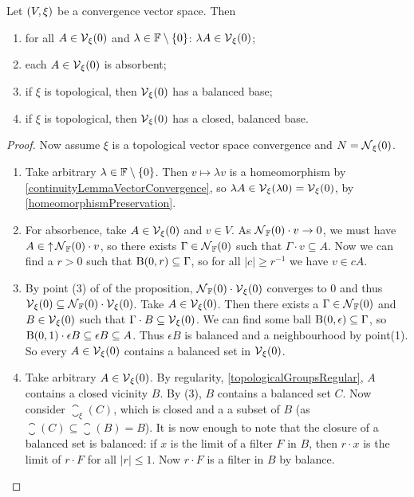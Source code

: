 \begin{corollary} \label{vicinityFilterAtOrigin}
Let $\left( V, \xi \right)$ be a convergence vector space. Then
\begin{enumerate}
\item for all $A\in \operatorname{\mathcal{V}}_\xi(0)$ and $\lambda\in \mathbb{F}\setminus\{0\}$: $\lambda A\in \operatorname{\mathcal{V}}_\xi(0)$;
\item each $A \in \operatorname{\mathcal{V}}_\xi(0)$ is absorbent;
\item if $\xi$ is topological, then $\operatorname{\mathcal{V}}_\xi(0)$ has a balanced base;
\item if $\xi$ is topological, then $\operatorname{\mathcal{V}}_\xi(0)$ has a closed, balanced base.
\end{enumerate}
\end{corollary}
\begin{proof}
Now assume $\xi$ is a topological vector space convergence and $N = \operatorname{\mathcal{N}}_\xi(0)$.
\begin{enumerate}
\item Take arbitrary $\lambda\in\mathbb{F}\setminus\{0\}$. Then $v\mapsto \lambda v$ is a homeomorphism by \ref{continuityLemmaVectorConvergence}, so $\lambda A \in \operatorname{\mathcal{V}}_\xi(\lambda 0) = \operatorname{\mathcal{V}}_\xi(0)$, by \ref{homeomorphismPreservation}.
\item For absorbence, take $A\in \operatorname{\mathcal{V}}_\xi(0)$ and $v\in V$. As $\operatorname{\mathcal{N}}_{\mathbb{F}}(0)\cdot v \to 0$, we must have $A\in \operatorname{\uparrow}\operatorname{\mathcal{N}}_{\mathbb{F}}(0)\cdot v$, so there exists $\Gamma \in \operatorname{\mathcal{N}}_{\mathbb{F}}(0)$ such that $\Gamma\cdot v \subseteq A$. Now we can find a $r>0$ such that $\operatorname{B}(0,r)\subseteq \Gamma$, so for all $|c|\geq r^{-1}$ we have $v\in cA$.
\item By point (3) of of the proposition, $\operatorname{\mathcal{N}}_{\mathbb{F}}(0)\cdot \operatorname{\mathcal{V}}_\xi(0)$ converges to $0$ and thus $\operatorname{\mathcal{V}}_\xi(0) \subseteq \operatorname{\mathcal{N}}_{\mathbb{F}}(0)\cdot\operatorname{\mathcal{V}}_\xi(0)$. Take $A\in \operatorname{\mathcal{V}}_\xi(0)$. Then there exists a $\Gamma\in\operatorname{\mathcal{N}}_{\mathbb{F}}(0)$ and $B\in \operatorname{\mathcal{V}}_\xi(0)$ such that $\Gamma\cdot B \subseteq \operatorname{\mathcal{V}}_\xi(0)$. We can find some ball $\operatorname{B}(0,\epsilon) \subseteq \Gamma$, so $\operatorname{B}(0,1)\cdot \epsilon B\subseteq \epsilon B \subseteq A$. Thus $\epsilon B$ is balanced and a neighbourhood by point(1). So every $A\in \operatorname{\mathcal{V}}_\xi(0)$ contains a balanced set in $\operatorname{\mathcal{V}}_\xi(0)$.
\item Take arbitrary $A\in \operatorname{\mathcal{V}}_\xi(0)$. By regularity, \ref{topologicalGroupsRegular}, $A$ contains a closed vicinity $B$. By (3), $B$ contains a balanced set $C$. Now consider $\closure_\xi(C)$, which is closed and a a subset of $B$ (as $\closure(C)\subseteq \closure(B) = B$). It is now enough to note that the closure of a balanced set is balanced: if $x$ is the limit of a filter $F$ in $B$, then $r\cdot x$ is the limit of $r\cdot F$ for all $|r|\leq 1$. Now $r\cdot F$ is a filter in $B$ by balance.
\end{enumerate}
\end{proof}

